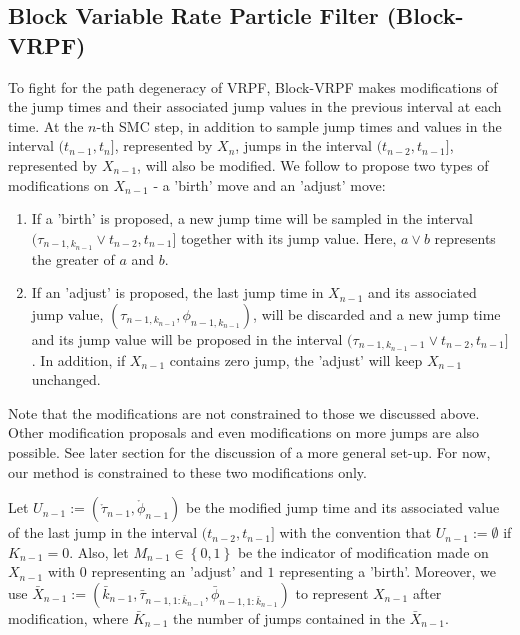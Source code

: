 \documentclass[12pt,a4paper]{article}
\begin{document}
\subsection{Block Variable Rate Particle Filter (Block-VRPF)}
To fight for the path degeneracy of VRPF, Block-VRPF makes modifications of the jump times and their associated jump values in the previous interval at each time. At the $n$-th SMC step, in addition to sample jump times and values in the interval $(t_{n-1},t_n]$, represented by $X_n$, jumps in the interval $(t_{n-2},t_{n-1}]$, represented by $X_{n-1}$, will also be modified. We follow \cite{Whiteley2011} to propose two types of modifications on $X_{n-1}$ - a 'birth' move and an 'adjust' move:
\begin{enumerate}
    \item If a 'birth' is proposed, a new jump time will be sampled in the interval $(\tau_{n-1,k_{n-1}}\vee t_{n-2},t_{n-1}]$ together with its jump value. Here, $a \vee b$ represents the greater of $a$ and $b$. 
    \item If an 'adjust' is proposed, the last jump time in $X_{n-1}$ and its associated jump value, $\left(\tau_{n-1,k_{n-1}},\phi_{n-1,k_{n-1}}\right)$, will be discarded and a new jump time and its jump value will be proposed in the interval $(\tau_{n-1,k_{n-1}-1} \vee t_{n-2},t_{n-1}]$. In addition, if $X_{n-1}$ contains zero jump, the 'adjust' will keep $X_{n-1}$ unchanged. 
\end{enumerate}

Note that the modifications are not constrained to those we discussed above. Other modification proposals and even modifications on more jumps are also possible. See later section for the discussion of a more general set-up. For now, our method is constrained to these two modifications only. 

Let $U_{n-1} := \left(\mathring{\tau}_{n-1},\mathring{\phi}_{n-1}\right)$ be the modified jump time and its associated value of the last jump in the interval $(t_{n-2},t_{n-1}]$ with the convention that $U_{n-1} := \emptyset$ if $K_{n-1} = 0$. Also, let $M_{n-1} \in \left\{0,1\right\}$ be the indicator of modification made on $X_{n-1}$ with $0$ representing an 'adjust' and $1$ representing a 'birth'. Moreover, we use $\bar{X}_{n-1}:=\left(\bar{k}_{n-1},\bar{\tau}_{n-1,1:\bar{k}_{n-1}},\bar{\phi}_{n-1,1:\bar{k}_{n-1}}\right)$ to represent $X_{n-1}$ after modification, where $\bar{K}_{n-1}$ the number of jumps contained in the $\bar{X}_{n-1}$. 
\end{document}
